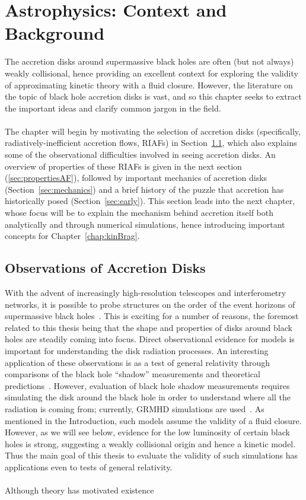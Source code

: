 \chapter{Astrophysics: Context and Background} \label{chap:astrophysics}
The accretion disks around supermassive black holes are often (but not always) weakly collisional, hence providing an excellent context for exploring the validity of approximating kinetic theory with a fluid closure. However, the literature on the topic of black hole accretion disks is vast, and so this chapter seeks to extract the important ideas and clarify common jargon in the field.\\
\\
The chapter will begin by motivating the selection of accretion disks (specifically, radiatively-inefficient accretion flows, RIAFs) in Section~\ref{sec:obsmotive}, which also explains some of the observational difficulties involved in seeing accretion disks. An overview of properties of these RIAFs is given in the next section (\ref{sec:propertiesAF}), followed by important mechanics of accretion disks (Section~\ref{sec:mechanics}) and a brief history of the puzzle that accretion has historically posed (Section~\ref{sec:early}). This section leads into the next chapter, whose focus will be to explain the mechanism behind accretion itself both analytically and through numerical simulations, hence introducing important concepts for Chapter~\ref{chap:kinBrag}.  

\section{Observations of Accretion Disks} \label{sec:obsmotive}
With the advent of increasingly high-resolution telescopes and interferometry networks, it is possible to probe structures on the order of the event horizons of supermassive black holes~\cite{EHT}. This is exciting for a number of reasons, the foremost related to this thesis being that the shape and properties of disks around black holes are steadily coming into focus. Direct observational evidence for models is important for understanding the disk radiation processes. An interesting application of these observations is as a test of general relativity through comparisons of the black hole ``shadow'' measurements and theoretical predictions~\cite{Psaltis2015}. However, evaluation of black hole shadow measurements requires simulating the disk around the black hole in order to understand where all the radiation is coming from; currently, GRMHD simulations are used~\cite{Psaltis2015}. As mentioned in the Introduction, such models assume the validity of a fluid closure. However, as we will see below, evidence for the low luminosity of certain black holes is strong, suggesting a weakly collisional origin and hence a kinetic model. Thus the main goal of this thesis to evaluate the validity of such simulations has applications even to tests of general relativity.\\
\\
Although theory has motivated existence


